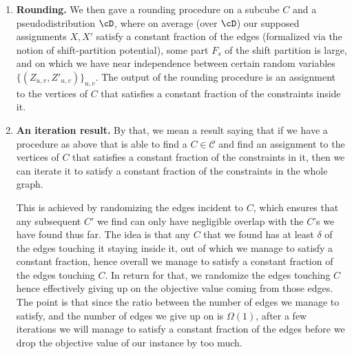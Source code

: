 \begin{enumerate}
    To circumvent this, we showed that: 
    \begin{enumerate}
        \item \textbf{Eliminating global correlations:} using conditioning (as in~\cite{RT12}) we are able to make sure that the two collection 
    of random variables $\{Z_{u,v}\}_{u,v\in C}, \{Z'_{u,v}\}_{u,v\in C}$ of interest 
    (that are concerned with local information about the assignments $X$ and $X'$ on vertices $u,v$) are roughly
    pairwise independent.
        \item \textbf{Conditioning mostly preserves independence:} As the probability of the event that
        $C$ becomes dense in $F_s$ is noticeable, and $\{Z_{u,v}\}_{u,v\in C}$,$\{Z'_{u,v}\}_{u,v\in C}$ were pairwise-independent to begin with, we argue 
        that it cannot create too many dependencies between
        $(Z_{u,v}, Z'_{u,v})$.
    \end{enumerate} 
    
    \item \textbf{Rounding.} We then gave a rounding procedure on a subcube $C$ and a pseudodistribution $\cD$, where on average (over $\cD$) our supposed assignments $X,X'$ satisfy a constant fraction of the edges (formalized via the notion of
    shift-partition potential), some part $F_s$ of the shift partition is large, and on which we have near 
    independence between certain random variables 
    $\{(Z_{u,v},Z'_{u,v})\}_{u,v}$. The output of the rounding procedure is an assignment to the vertices of $C$ that satisfies a constant fraction of the constraints inside it.
    
    \item \textbf{An iteration result.} By that, we mean a result saying that if we have a procedure as above that is able to find a $C\in\mathcal{C}$ and find an assignment to the vertices of $C$ that satisfies a constant fraction of the constraints in it, then we can iterate it to satisfy a constant fraction 
    of the constraints in the whole graph. 
    
    This is achieved by randomizing the edges incident to $C$, which ensures that any subsequent $C'$ we find can only have negligible overlap with the $C$'s we have found thus far.
    The idea is that any $C$ that we found has at least 
    $\delta$ of the edges touching it staying inside it, 
    out of which we manage to satisfy a constant fraction, 
    hence overall we manage to satisfy a constant fraction
    of the edges touching $C$. In return for that, 
    we randomize the edges touching $C$ hence effectively giving up on the objective value coming from those edges. The point is that since the ratio between the number of edges we manage to satisfy, and the number of edges we give up on is $\Omega(1)$, after a few iterations we will manage to satisfy a 
    constant fraction of the edges before we drop the objective value of our instance by too much.
\end{enumerate}


